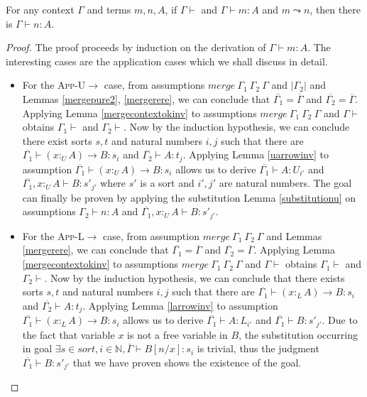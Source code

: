 \documentclass[sigplan,screen,review,anonymous]{acmart}
\newcommand{\rname}[1]{\textsc{\footnotesize #1}}
\newcommand{\pure}[1]{|#1|}
\newcommand{\utype}{:_{\scriptscriptstyle U}}
\newcommand{\ltype}{:_{\scriptscriptstyle L}}
\newcommand{\step}{\leadsto}
\newcommand{\mrg}[3]{merge\ {#1}\ {#2}\ {#3}}
\begin{document}
\begin{theorem}
  For any context $\Gamma$ and terms $m, n, A$, if $\Gamma \vdash$ and $\Gamma \vdash m : A$ and $m \step n$, then there is $\Gamma \vdash n : A$.
\end{theorem}
\begin{proof}
  The proof proceeds by induction on the derivation of $\Gamma \vdash m : A$. The interesting cases are the application cases which we shall discuss in detail.
  \begin{itemize}
    \item For the \rname{App-U$\rightarrow$} case, from assumptions $\mrg{\Gamma_1}{\Gamma_2}{\Gamma}$ and $\pure{\Gamma_2}$ and Lemmas \ref{mergepure2}, \ref{mergerere}, we can conclude that $\overline{\Gamma_1} = \overline{\Gamma}$ and $\overline{\Gamma_2} = \overline{\Gamma}$. Applying Lemma \ref{mergecontextokinv} to assumptions $\mrg{\Gamma_1}{\Gamma_2}{\Gamma}$ and $\Gamma \vdash$ obtains $\Gamma_1 \vdash$ and $\Gamma_2 \vdash$. Now by the induction hypothesis, we can conclude there exist sorts $s, t$ and natural numbers $i, j$ such that there are $\overline{\Gamma_1} \vdash (x \utype A) \rightarrow B : s_i$ and $\overline{\Gamma_2} \vdash A : t_j$. Applying Lemma \ref{uarrowinv} to assumption $\overline{\Gamma_1} \vdash (x \utype A) \rightarrow B : s_i$ allows us to derive $\overline{\Gamma_1} \vdash A : U_{i'}$ and $\overline{\Gamma_1}, x \utype A \vdash B : s'_{j'}$ where $s'$ is a sort and $i', j'$ are natural numbers. The goal can finally be proven by applying the substitution Lemma \ref{substitutionu} on assumptions $\Gamma_2 \vdash n : A$ and $\overline{\Gamma_1}, x \utype A \vdash B : s'_{j'}$.
    \item For the \rname{App-L$\rightarrow$} case, from assumption $\mrg{\Gamma_1}{\Gamma_2}{\Gamma}$ and Lemmas \ref{mergerere}, we can conclude that $\overline{\Gamma_1} = \overline{\Gamma}$ and $\overline{\Gamma_2} = \overline{\Gamma}$. Applying Lemma \ref{mergecontextokinv} to assumptions $\mrg{\Gamma_1}{\Gamma_2}{\Gamma}$ and $\Gamma \vdash$ obtains $\Gamma_1 \vdash$ and $\Gamma_2 \vdash$. Now by the induction hypothesis, we can conclude that there exists sorts $s, t$ and natural numbers $i, j$ such that there are $\overline{\Gamma_1} \vdash (x \ltype A) \rightarrow B : s_i$ and $\overline{\Gamma_2} \vdash A : t_j$. Applying Lemma \ref{larrowinv} to assumption $\overline{\Gamma_1} \vdash (x \ltype A) \rightarrow B : s_i$ allows us to derive $\overline{\Gamma_1} \vdash A : L_{i'}$ and $\overline{\Gamma_1} \vdash B : s'_{j'}$. Due to the fact that variable $x$ is not a free variable in $B$, the substitution occurring in goal $\exists s \in sort, i \in \mathbb{N}, \overline{\Gamma} \vdash B[n/x] : s_i$ is trivial, thus the judgment $\overline{\Gamma_1} \vdash B : s'_{j'}$ that we have proven shows the existence of the goal.

\end{itemize}
\end{proof}
\end{document}
